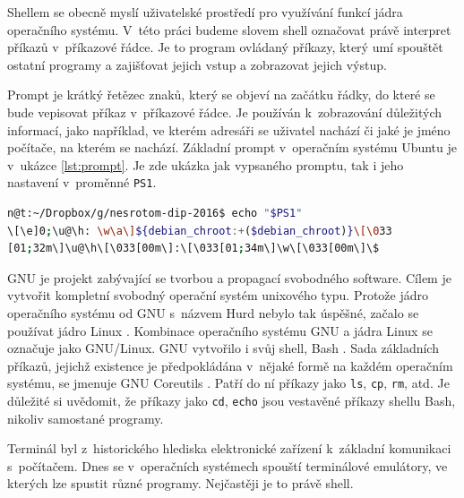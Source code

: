 \documentclass[thesis=M,czech]{FITthesis}[2012/06/26]
\begin{document}
Shellem se obecně myslí uživatelské prostředí pro využívání funkcí jádra operačního systému. V~této práci budeme slovem shell označovat právě interpret příkazů v~příkazové řádce. Je to program ovládaný příkazy, který umí spouštět ostatní programy a zajišťovat jejich vstup a zobrazovat jejich výstup.


Prompt je krátký řetězec znaků, který se objeví na začátku řádky, do které se bude vepisovat příkaz v~příkazové řádce. Je používán k~zobrazování důležitých informací, jako například, ve kterém adresáři se uživatel nachází či jaké je jméno počítače, na kterém se nachází. Základní prompt v~operačním systému Ubuntu \cite{ubuntu} je v~ukázce \ref{lst:prompt}. Je zde ukázka jak vypsaného promptu, tak i jeho nastavení v~proměnné \texttt{PS1}.

\noindent
\begin{minipage}{\linewidth}
\begin{lstlisting}[language=bash, caption={Prompt v~shellu}, label={lst:prompt}]
n@t:~/Dropbox/g/nesrotom-dip-2016$ echo "$PS1"
\[\e]0;\u@\h: \w\a\]${debian_chroot:+($debian_chroot)}\[\033
[01;32m\]\u@\h\[\033[00m\]:\[\033[01;34m\]\w\[\033[00m\]\$
\end{lstlisting}
\end{minipage}



GNU \cite{gnu} je projekt zabývající se tvorbou a propagací svobodného software. Cílem je vytvořit kompletní svobodný operační systém unixového typu. Protože jádro operačního systému od GNU s~názvem Hurd \cite{hurd} nebylo tak úspěšné, začalo se používat jádro Linux \cite{linuxkernel}. Kombinace operačního systému GNU a jádra Linux se označuje jako GNU/Linux. GNU vytvořilo i svůj shell, Bash \cite{bash}. Sada základních příkazů, jejichž existence je předpokládána v~nějaké formě na každém operačním systému, se jmenuje GNU Coreutils \cite{coreutils}. Patří do ní příkazy jako \texttt{ls}, \texttt{cp}, \texttt{rm}, atd. Je důležité si uvědomit, že příkazy jako \texttt{cd}, \texttt{echo} jsou vestavěné příkazy shellu Bash, nikoliv samostané programy.


Terminál byl z~historického hlediska elektronické zařízení k~základní komunikaci s~počítačem. Dnes se v~operačních systémech spouští terminálové emulátory, ve kterých lze spustit různé programy. Nejčastěji je to právě shell.
\end{document}
